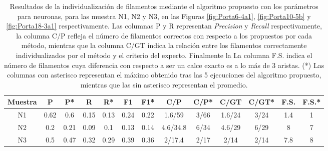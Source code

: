 \begin{table}[h]
    \centering
    \small
    \begin{tabular}{|c|c|c|c|c|c|c|c|c|c|c|c|c|}
    \hline
          Muestra & P & P* & R & R* & F1 & F1* & C/P & C/P* & C/GT & C/GT* & F.S. & F.S.* \\ \hline
        N1 & 0.62 & 0.6 & 0.15 & 0.13 & 0.24 & 0.22 & 1.6/59 & 3/66 & 1.6/24 & 3/24 & 1.4 & 1\\
        N2 & 0.2 & 0.21 & 0.09 & 0.1 & 0.13 & 0.14 & 4.6/34.8 & 6/34 & 4.6/29 & 6/29 & 8 & 7 \\
        N3 & 0.5 & 0.47 & 0.32 & 0.29 & 0.39 & 0.36 & 2/17.4 & 2/17 & 2/14 & 2/14 & 7.8 & 8\\
        \hline
    \end{tabular}
    
    \caption[Resultados de la individualizaci\'on de filamentos mediante el algoritmo propuesto para las muestra N1, N2 y N3.]{Resultados de la individualizaci\'on de filamentos mediante el algoritmo propuesto con los par\'ametros para neuronas, para las muestra N1, N2 y N3, en las Figuras \ref{fig:Porta6-4a1}, \ref{fig:Porta10-5b} y \ref{fig:Porta18-3a1} respectivamente. Las columnas P y R representan {\it Precision} y {\it Recall} respectivamente, la columna C/P refleja el n\'umero de filamentos correctos con respecto a los propuestos por cada m\'etodo, mientras que la columna C/GT indica la relaci\'on entre los filamentos correctamente individualizados por el m\'etodo y el criterio del experto. Finalmente la La columna F.S. indica el n\'umero de filamentos cuya diferencia con respecto a ser un calce exacto es a lo m\'as de 3 aristas. (*) Las columnas con asterisco representan el m\'aximo obtenido tras las 5 ejecuciones del algoritmo propuesto, mientras que las sin asterisco representan el promedio.}
    \label{tab:neuronResults}
\end{table}





